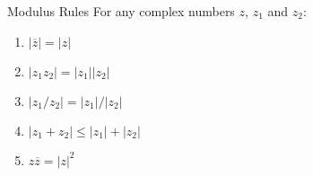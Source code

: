 \documentclass[\main/notes.tex]{subfiles}
\begin{document}
			\begin{sidenote}{Modulus Rules}
				For any complex numbers $z$, $z_{1}$ and $z_{2}$:
				\begin{enumerate}[label=(\alph*)]
					\item $\left\lvert \overline{z}\right\rvert = \left\lvert z\right\rvert $
					\item $\left\lvert z_{1}z_{2}\right\rvert = \left\lvert z_{1}\right\rvert \left\lvert z_{2}\right\rvert $
					\item $\left\lvert z_{1}/z_{2}\right\rvert = \left\lvert z_{1}\right\rvert /\left\lvert z_{2}\right\rvert $
					\item $\left\lvert z_{1} + z_{2}\right\rvert \leq \left\lvert z_{1}\right\rvert + \left\lvert z_{2}\right\rvert $
					\item $z\overline{z} = \left\lvert z\right\rvert^{2}$
				\end{enumerate}
			\end{sidenote}
\end{document}
